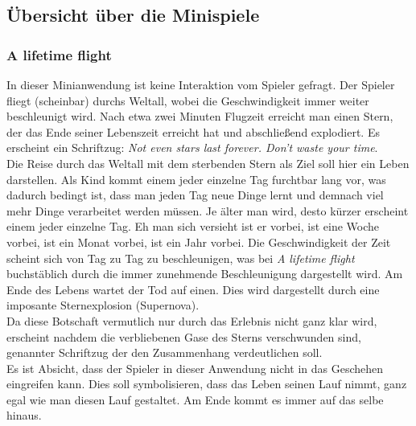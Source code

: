 \documentclass{Ausarbeitung}
\begin{document}
	\subsection{Übersicht über die Minispiele}
	\label{minispiele}
		\subsubsection{A lifetime flight}
			In dieser Minianwendung ist keine Interaktion vom Spieler gefragt. Der Spieler fliegt (scheinbar) durchs Weltall, wobei die Geschwindigkeit immer weiter beschleunigt wird. Nach etwa zwei Minuten Flugzeit erreicht man einen Stern, der das Ende seiner Lebenszeit erreicht hat und abschließend explodiert. Es erscheint ein Schriftzug: \textit{Not even stars last forever. Don't waste your time}. \\
			Die Reise durch das Weltall mit dem sterbenden Stern als Ziel soll hier ein Leben darstellen. Als Kind kommt einem jeder einzelne Tag furchtbar lang vor, was dadurch bedingt ist, dass man jeden Tag neue Dinge lernt und demnach viel mehr Dinge verarbeitet werden müssen. Je älter man wird, desto kürzer erscheint einem jeder einzelne Tag. Eh man sich versieht ist er vorbei, ist eine Woche vorbei, ist ein Monat vorbei, ist ein Jahr vorbei. Die Geschwindigkeit der Zeit scheint sich von Tag zu Tag zu beschleunigen, was bei \textit{A lifetime flight} buchstäblich durch die immer zunehmende Beschleunigung dargestellt wird. Am Ende des Lebens wartet der Tod auf einen. Dies wird dargestellt durch eine imposante Sternexplosion (Supernova). \\
			Da diese Botschaft vermutlich nur durch das Erlebnis nicht ganz klar wird, erscheint nachdem die verbliebenen Gase des Sterns verschwunden sind, genannter Schriftzug der den Zusammenhang verdeutlichen soll. \\
			Es ist Absicht, dass der Spieler in dieser Anwendung nicht in das Geschehen eingreifen kann. Dies soll symbolisieren, dass das Leben seinen Lauf nimmt, ganz egal wie man diesen Lauf gestaltet. Am Ende kommt es immer auf das selbe hinaus. 
\end{document}
